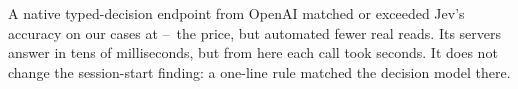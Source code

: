 \begin{table}[htbp]\centering\footnotesize\setlength\tabcolsep{4pt}
\caption{OpenAI Decisions API (post hoc) against the in-run Jev reference: correct decisions, wrong automatic actions,
coverage, client latency (from our machine, slow network in this run) and dollars per million decisions.}\label{tab:openai}
\end{table}
\begin{keyidea}
A native typed-decision endpoint from OpenAI matched or exceeded Jev's accuracy on our cases at \OaPriceXLo--\OaPriceXHi\X\ the price, but automated fewer real reads. Its
servers answer in tens of milliseconds, but from here each call took seconds. It does not change the session-start
finding: a one-line rule matched the decision model there.
\end{keyidea}
